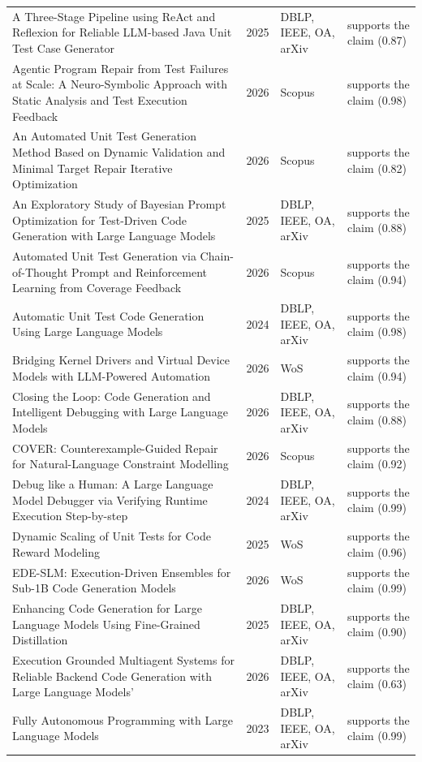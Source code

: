 \begin{longtable}{@{}%
  >{\raggedright\arraybackslash}p{}c%
  >{\raggedright\arraybackslash}p{}%
  >{\raggedright\arraybackslash}p{}@{}}
A Three-Stage Pipeline using ReAct and Reflexion for Reliable LLM-based Java Unit Test Case Generator & 2025 & DBLP, IEEE, OA, arXiv & supports the claim (0.87) \\
Agentic Program Repair from Test Failures at Scale: A Neuro-Symbolic Approach with Static Analysis and Test Execution Feedback & 2026 & Scopus & supports the claim (0.98) \\
An Automated Unit Test Generation Method Based on Dynamic Validation and Minimal Target Repair Iterative Optimization & 2026 & Scopus & supports the claim (0.82) \\
An Exploratory Study of Bayesian Prompt Optimization for Test-Driven Code Generation with Large Language Models & 2025 & DBLP, IEEE, OA, arXiv & supports the claim (0.88) \\
Automated Unit Test Generation via Chain-of-Thought Prompt and Reinforcement Learning from Coverage Feedback & 2026 & Scopus & supports the claim (0.94) \\
Automatic Unit Test Code Generation Using Large Language Models & 2024 & DBLP, IEEE, OA, arXiv & supports the claim (0.98) \\
Bridging Kernel Drivers and Virtual Device Models with LLM-Powered Automation & 2026 & WoS & supports the claim (0.94) \\
Closing the Loop: Code Generation and Intelligent Debugging with Large Language Models & 2026 & DBLP, IEEE, OA, arXiv & supports the claim (0.88) \\
COVER: Counterexample-Guided Repair for Natural-Language Constraint Modelling & 2026 & Scopus & supports the claim (0.92) \\
Debug like a Human: A Large Language Model Debugger via Verifying Runtime Execution Step-by-step & 2024 & DBLP, IEEE, OA, arXiv & supports the claim (0.99) \\
Dynamic Scaling of Unit Tests for Code Reward Modeling & 2025 & WoS & supports the claim (0.96) \\
EDE-SLM: Execution-Driven Ensembles for Sub-1B Code Generation Models & 2026 & WoS & supports the claim (0.99) \\
Enhancing Code Generation for Large Language Models Using Fine-Grained Distillation & 2025 & DBLP, IEEE, OA, arXiv & supports the claim (0.90) \\
Execution Grounded Multiagent Systems for Reliable Backend Code Generation with Large Language Models' & 2026 & DBLP, IEEE, OA, arXiv & supports the claim (0.63) \\
Fully Autonomous Programming with Large Language Models & 2023 & DBLP, IEEE, OA, arXiv & supports the claim (0.99) \\

\end{longtable}
